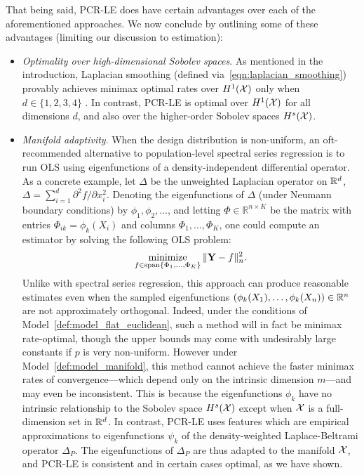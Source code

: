 That being said, PCR-LE does have certain advantages over each of the aforementioned approaches. We now conclude by outlining some of these advantages (limiting our discussion to estimation):
\begin{itemize}
	\item \emph{Optimality over high-dimensional Sobolev spaces}. As mentioned in the introduction, Laplacian smoothing (defined via~\eqref{eqn:laplacian_smoothing}) provably achieves minimax optimal rates over $H^1(\mathcal{X})$ only when $d \in \{1,2,3,4\}$ \citep{sadhanala16, green2021}. In contrast, PCR-LE is optimal over $H^1(\mathcal{X})$ for all dimensions $d$, and also over the higher-order Sobolev spaces $H^s(\mathcal{X})$. 
	\item \emph{Manifold adaptivity}. When the design distribution is non-uniform, an oft-recommended alternative to population-level spectral series regression is to run OLS using eigenfunctions of a density-independent differential operator. As a concrete example, let $\Delta$ be the unweighted Laplacian operator on $\mathbb{R}^d$, $\Delta = \sum_{i = 1}^{d} \partial^2f/\partial x_i^2$. Denoting the eigenfunctions of $\Delta$ (under Neumann boundary conditions) by $\phi_1,\phi_2,\ldots$, and letting $\Phi \in \mathbb{R}^{n \times K}$ be the matrix with entries $\Phi_{ik} = \phi_k(X_i)$ and columns $\Phi_1,\ldots,\Phi_K$,  one could compute an estimator by solving the following OLS problem:
	\begin{equation*}
	\mathop{\mathrm{minimize}}_{f \in \mathrm{span}\{\Phi_{1},\ldots,\Phi_{K}\}} \|{\bf Y} - f\|_n^2.
	\end{equation*}
	Unlike with spectral series regression, this approach can produce reasonable estimates even when the sampled eigenfunctions $(\phi_k(X_1),\ldots,\phi_k(X_n)) \in \mathbb{R}^n$ are not approximately orthogonal. Indeed, under the conditions of Model~\ref{def:model_flat_euclidean}, such a method will in fact be minimax rate-optimal, though the upper bounds may come with undesirably large constants if $p$ is very non-uniform. However under Model~\ref{def:model_manifold}, this method cannot achieve the faster minimax rates of convergence---which depend only on the intrinsic dimension $m$---and may even be inconsistent. This is because the eigenfunctions $\phi_k$ have no intrinsic relationship to the Sobolev space $H^s(\mathcal{X})$ except when $\mathcal{X}$ is a full-dimension set in $\mathbb{R}^d$. In contrast, PCR-LE uses features which are empirical approximations to eigenfunctions $\psi_k$ of the density-weighted Laplace-Beltrami operator $\Delta_P$. The eigenfunctions of $\Delta_P$ are thus adapted to the manifold $\mathcal{X}$, and PCR-LE is consistent and in certain cases optimal, as we have shown. 

\end{itemize}
